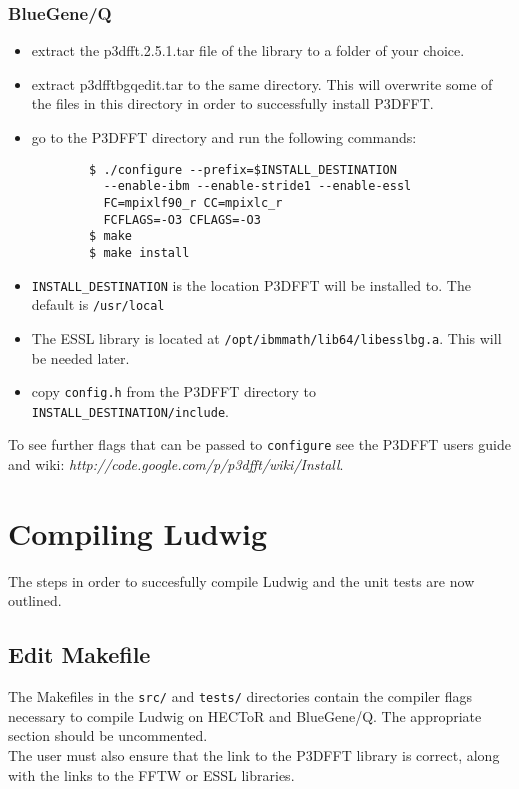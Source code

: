 \documentclass[12pt,a4paper]{article}
\begin{document}
\subsubsection{BlueGene/Q}
  \begin{itemize}
    \item extract the p3dfft.2.5.1.tar file of the library to a folder of your choice.
    \item extract p3dfftbgqedit.tar to the same directory. This will overwrite some of the files in this directory in order to successfully install P3DFFT.
    \item go to the P3DFFT directory and run the following commands:
      \begin{verbatim}
        $ ./configure --prefix=$INSTALL_DESTINATION
          --enable-ibm --enable-stride1 --enable-essl 
          FC=mpixlf90_r CC=mpixlc_r
          FCFLAGS=-O3 CFLAGS=-O3
        $ make
        $ make install
      \end{verbatim}
    \item \texttt{INSTALL\_DESTINATION} is the location P3DFFT will be installed to. The default is \texttt{/usr/local}
    \item The ESSL library is located at \texttt{/opt/ibmmath/lib64/libesslbg.a}. This will be needed later.
    \item copy \texttt{config.h} from the P3DFFT directory to \texttt{INSTALL\_DESTINATION/include}.
  \end{itemize}
    
To see further flags that can be passed to \texttt{configure} see the P3DFFT users guide and wiki: \textit{http://code.google.com/p/p3dfft/wiki/Install}.

\section{Compiling Ludwig}
The steps in order to succesfully compile Ludwig and the unit tests are now outlined.

\subsection{Edit Makefile}
  The Makefiles in the \texttt{src/} and \texttt{tests/} directories contain the compiler flags necessary to compile Ludwig on HECToR and BlueGene/Q. The appropriate section should be uncommented.\\
  The user must also ensure that the link to the P3DFFT library is correct, along with the links to the FFTW or ESSL libraries.
\end{document}
